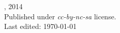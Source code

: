 \documentclass[grammar]{subfiles}
\begin{document}
\null\vfill
\begin{minipage}[b][][b]{0.5\textwidth}

  {\normalsize\ccbyncsa}\small\qquad\myauthor, 2014\\[\parsep]
  Published under \textit{cc-by-nc-sa} license.  \\
  Last edited: \today\\[2\parsep]

\end{minipage}
\end{document}
